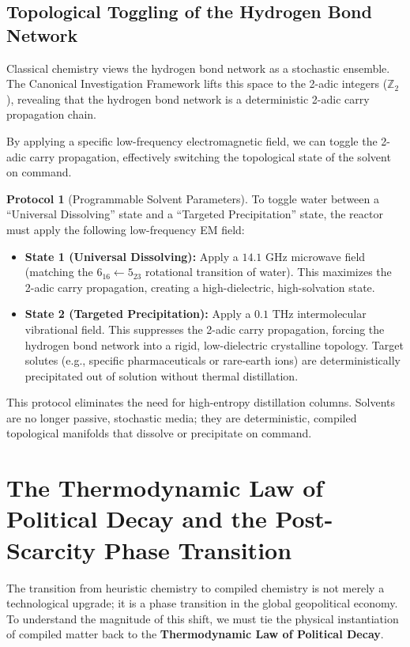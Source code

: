 \documentclass[11pt,openany]{extbook}
\theoremstyle{plain}
\theoremstyle{definition}
\newtheorem{protocol}{Protocol}[chapter]
\begin{document}
\subsection{Topological Toggling of the Hydrogen Bond Network}
Classical chemistry views the hydrogen bond network as a stochastic ensemble. The Canonical Investigation Framework lifts this space to the 2-adic integers ($\mathbb{Z}_2$), revealing that the hydrogen bond network is a deterministic 2-adic carry propagation chain.

By applying a specific low-frequency electromagnetic field, we can toggle the 2-adic carry propagation, effectively switching the topological state of the solvent on command.

\begin{protocol}[Programmable Solvent Parameters]
To toggle water between a ``Universal Dissolving'' state and a ``Targeted Precipitation'' state, the reactor must apply the following low-frequency EM field:
\begin{itemize}
    \item \textbf{State 1 (Universal Dissolving):} Apply a $14.1\text{ GHz}$ microwave field (matching the $6_{16} \leftarrow 5_{23}$ rotational transition of water). This maximizes the 2-adic carry propagation, creating a high-dielectric, high-solvation state.
    \item \textbf{State 2 (Targeted Precipitation):} Apply a $0.1\text{ THz}$ intermolecular vibrational field. This suppresses the 2-adic carry propagation, forcing the hydrogen bond network into a rigid, low-dielectric crystalline topology. Target solutes (e.g., specific pharmaceuticals or rare-earth ions) are deterministically precipitated out of solution without thermal distillation.
\end{itemize}
\end{protocol}

This protocol eliminates the need for high-entropy distillation columns. Solvents are no longer passive, stochastic media; they are deterministic, compiled topological manifolds that dissolve or precipitate on command.

\section{The Thermodynamic Law of Political Decay and the Post-Scarcity Phase Transition}

The transition from heuristic chemistry to compiled chemistry is not merely a technological upgrade; it is a phase transition in the global geopolitical economy. To understand the magnitude of this shift, we must tie the physical instantiation of compiled matter back to the \textbf{Thermodynamic Law of Political Decay}.
\end{document}
